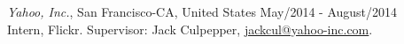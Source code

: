 \documentclass[margin]{res}
\begin{document}
\begin{resume}

			{\sl Yahoo, Inc.}, San Francisco-CA, United States \hfill May/2014 - August/2014 \\
			Intern, Flickr.
			Supervisor: Jack Culpepper, \href{mailto:jackcul@yahoo-inc.com}{jackcul@yahoo-inc.com}.

			


\end{resume}
\end{document}
